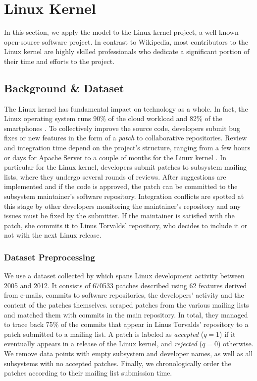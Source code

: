 \section{Linux Kernel}
\label{pps:sec:linux}

In this section, we apply the \interank{} model to the Linux kernel project, a well-known open-source software project.
In contrast to Wikipedia, most contributors to the Linux kernel are highly skilled professionals who dedicate a significant portion of their time and efforts to the project.

\subsection{Background \& Dataset}

The Linux kernel has fundamental impact on technology as a whole.
In fact, the Linux operating system runs 90\% of the cloud workload and 82\% of the smartphones \citep{corbet2017linux}.
To collectively improve the source code, developers submit bug fixes or new features in the form of a \emph{patch} to collaborative repositories.
Review and integration time depend on the project's structure, ranging from a few hours or days for Apache Server \citep{rigby2008open} to a couple of months for the Linux kernel \citep{jiang2013will}.
In particular for the Linux kernel, developers submit patches to subsystem mailing lists, where they undergo several rounds of reviews.
After suggestions are implemented and if the code is approved, the patch can be committed to the subsystem maintainer's software repository.
Integration conflicts are spotted at this stage by other developers monitoring the maintainer's repository and any issues must be fixed by the submitter.
If the maintainer is satisfied with the patch, she commits it to Linus Torvalds' repository, who decides to include it or not with the next Linux release.

\subsubsection{Dataset Preprocessing}

We use a dataset collected by \citet{jiang2013will} which spans Linux development activity between 2005 and 2012.
It consists of \num{670 533} patches described using \num{62} features derived from e-mails, commits to software repositories, the developers' activity and the content of the patches themselves.
\citeauthor{jiang2013will} scraped patches from the various mailing lists and matched them with commits in the main repository.
In total, they managed to trace back 75\% of the commits that appear in Linus Torvalds' repository to a patch submitted to a mailing list.
A patch is labeled as \emph{accepted} ($q = 1$) if it eventually appears in a release of the Linux kernel, and \emph{rejected} ($q = 0$) otherwise.
We remove data points with empty subsystem and developer names, as well as all subsystems with no accepted patches.
Finally, we chronologically order the patches according to their mailing list submission time.

